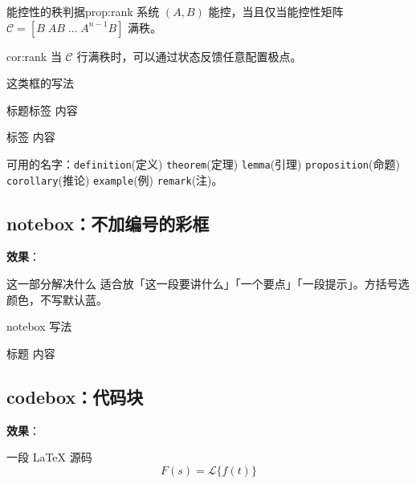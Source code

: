 \begin{proposition}{能控性的秩判据}{prop:rank}
系统 $(A,B)$ 能控，当且仅当能控性矩阵 $\mathcal{C}=[B\; AB\; \dots\; A^{n-1}B]$ 满秩。
\end{proposition}

\begin{corollary}{}{cor:rank}
当 $\mathcal{C}$ 行满秩时，可以通过状态反馈任意配置极点。
\end{corollary}

\begin{codebox}[latex]{这类框的写法}
\begin{proposition}{标题}{标签}  内容 \end{proposition}
\begin{corollary}{}{标签}  内容 \end{corollary}
\end{codebox}

可用的名字：\texttt{definition}(定义) \texttt{theorem}(定理) \texttt{lemma}(引理) \texttt{proposition}(命题) \texttt{corollary}(推论) \texttt{example}(例) \texttt{remark}(注)。

\subsection{notebox：不加编号的彩框}

\textbf{效果}：

\begin{notebox}[gr]{这一部分解决什么}
适合放「这一段要讲什么」「一个要点」「一段提示」。方括号选颜色，不写默认蓝。
\end{notebox}

\begin{codebox}[latex]{notebox 写法}
\begin{notebox}[gr]{标题}  内容  \end{notebox}
\end{codebox}

\subsection{codebox：代码块}

\textbf{效果}：

\begin{codebox}[latex]{一段 LaTeX 源码}
\begin{equation}\label{eq:demo}
  F(s) = \mathcal{L}\{f(t)\}
\end{equation}
\end{codebox}

